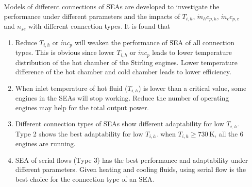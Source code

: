 Models of different connections of SEAs are developed to investigate the performance under different parameters and the impacts of $T_{i,h}$, $\dot{m}_hc_{p,h}$, $\dot{m}_cc_{p,c}$ and $n_{se}$ with different connection types. It is found that

\begin{enumerate}[label=(\arabic*)]
\item Reduce $T_{i,h}$ or $\dot{m}c_{p}$ will weaken the performance of SEA of all connection types. This is obvious since lower $T_{i,h}$ or $\dot{m}c_p$ leads to lower temperature distribution of the hot chamber of the Stirling engines. Lower temperature difference of the hot chamber and cold chamber leads to lower efficiency.
\item When inlet temperature of hot fluid ($T_{i,h}$) is lower than a critical value, some engines in the SEAs will stop working. Reduce the number of operating engines may help for the total output power.
\item Different connection types of SEAs show different adaptability for low $T_{i,h}$. Type 2 shows the best adaptability for low $T_{i,h}$. when $T_{i,h} \geqslant 730\,\mathrm{K}$, all the 6 engines are running.
\item SEA of serial flows (Type 3) has the best performance and adaptability under different parameters. Given heating and cooling fluids, using serial flow is the best choice for the connection type of an SEA.
	
\end{enumerate}

